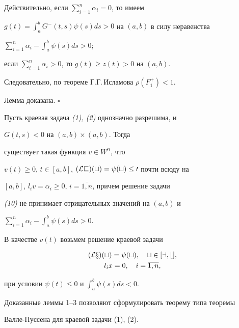  


Действительно, если $\sum^n_{i=1}\alpha_i=0$, то имеем 


$g(t)=\int^b_aG^-(t,s)\psi(s)ds>0$ на $(a,b)$ в силу неравенства 


$\sum^n_{i=1}\alpha_i-\int^b_a\psi(s)ds>0$; 


если $\sum^n_{i=1}\alpha_i>0$, то $g(t)\ge z(t)>0$ на $(a,b)$. 


Следовательно, по теореме Г.Г.\,Исламова $\rho(F^+_1)<1$. 


Лемма доказана. $\square$


 


\begin{lem} Пусть краевая задача {\em (1), (2)} однозначно разрешима, и 


$G(t,s)<0$ на $(a,b)\times(a,b)$. Тогда 


существует такая функция $v\in W^n$, что 


$v(t)\ge 0$, $t\in[a,b]$, $(\cal Lv)(t)=\psi(t)\le 0$ почти всюду на 


$[a,b]$, $l_iv=\alpha_i\ge 0$, $i=\overline{1,n}$, причем решение задачи 


{\em (10)} не принимает отрицательных значений на $(a,b)$ и 


$\sum^n_{i=1}\alpha_i-\int^b_a\psi(s)ds>0$. 


\end{lem} 


 


\begin{pf} В качестве $v(t)$ возьмем решение краевой задачи 


\begin{gather*} 


(\cal Lx)(t)=\psi(t),\quad t\in[a,b],\\ 


l_ix=0,\quad i=\overline{1,n}, 


\end{gather*} 


при условии $\psi(t)\le 0$ и $\int^b_a\psi(s)ds<0$. 


\end{pf} 


 


Доказанные леммы 1--3 позволяют сформулировать теорему типа теоремы 


Валле-Пуссена \cite{Val} для краевой задачи (1), (2). 


